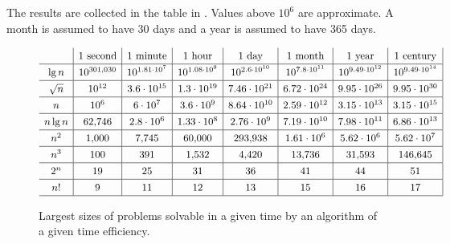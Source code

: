 The results are collected in the table in .
Values above $10^6$ are approximate.
A month is assumed to have 30 days and a year is assumed to have 365 days.

\begin{figure}[htb]
    \[
        \renewcommand{\arraystretch}{1.3}
        \begin{array}{c|c|c|c|c|c|c|c|}
            & \text{1 second} & \text{1 minute} & \text{1 hour} & \text{1 day} & \text{1 month} & \text{1 year} & \text{1 century} \\
            \hline
            \lg n & 10^{301{,}030} & 10^{1.81\cdot10^7} & 10^{1.08\cdot10^9} & 10^{2.6\cdot10^{10}} & 10^{7.8\cdot10^{11}} & 10^{9.49\cdot10^{12}} & 10^{9.49\cdot10^{14}} \\
            \hline
            \sqrt{n} & 10^{12} & 3.6\cdot10^{15} & 1.3\cdot10^{19} & 7.46\cdot10^{21} & 6.72\cdot10^{24} & 9.95\cdot10^{26} & 9.95\cdot10^{30} \\
            \hline
            n & 10^6 & 6\cdot10^7 & 3.6\cdot10^9 & 8.64\cdot10^{10} & 2.59\cdot10^{12} & 3.15\cdot10^{13} & 3.15\cdot10^{15} \\
            \hline
            n\lg n & 62{,}746 & 2.8\cdot10^6 & 1.33\cdot10^8 & 2.76\cdot10^9 & 7.19\cdot10^{10} & 7.98\cdot10^{11} & 6.86\cdot10^{13} \\
            \hline
            n^2 & 1{,}000 & 7{,}745 & 60{,}000 & 293{,}938 & 1.61\cdot10^6 & 5.62\cdot10^6 & 5.62\cdot10^7 \\
            \hline
            n^3 & 100 & 391 & 1{,}532 & 4{,}420 & 13{,}736 & 31{,}593 & 146{,}645 \\
            \hline
            2^n & 19 & 25 & 31 & 36 & 41 & 44 & 51 \\
            \hline
            n! & 9 & 11 & 12 & 13 & 15 & 16 & 17 \\
            \hline
        \end{array}
    \]
    \caption{Largest sizes of problems solvable in a given time by an algorithm of a given time efficiency.} \label{fig:1-1}
\end{figure}
